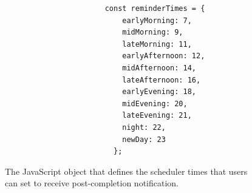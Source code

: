 \begin{figure}[H]
  \centering
\begin{lstlisting}
                       const reminderTimes = {
                           earlyMorning: 7,
                           midMorning: 9,
                           lateMorning: 11,
                           earlyAfternoon: 12,
                           midAfternoon: 14,
                           lateAfternoon: 16,
                           earlyEvening: 18,
                           midEvening: 20,
                           lateEvening: 21,
                           night: 22,
                           newDay: 23
                         };
\end{lstlisting}

  \caption{The JavaScript object that defines the scheduler times that users can set to receive post-completion notification.}
  \label{fig:reminder_times}
\end{figure}

